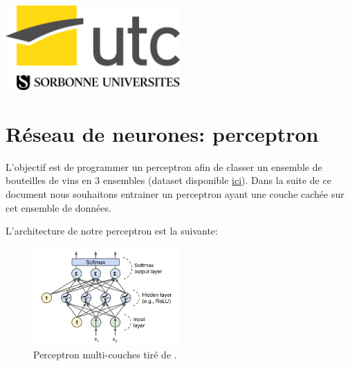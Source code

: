 \documentclass[a4paper,11pt,oneside,roman]{article}
\begin{document}
\begin{titlepage}
        
        \includegraphics[width=0.5\textwidth]{imgs/logo_UTC_SU.jpg}\\[1cm] %
        
        
        \vfill %
        
    \end{titlepage}
    
    
    \pagebreak
        
    \section{Réseau de neurones: perceptron}
    
    L'objectif est de programmer un perceptron afin de classer un ensemble de bouteilles de vins en 3 ensembles (dataset disponible \href{http://scikit-learn.org/stable/modules/generated/sklearn.datasets.load_wine.html}{ici}). 
    Dans la suite de ce document nous souhaitons entrainer un perceptron ayant une couche cachée sur cet ensemble de données.

    L'architecture de notre perceptron est la suivante:
    \begin{figure}
        \centering
        \includegraphics[width=0.5\textwidth]{imgs/perceptron.png}
        \caption{Perceptron multi-couches tiré de \cite{geron}.}
        \label{fig_perceptron}
    \end{figure}
\end{document}
